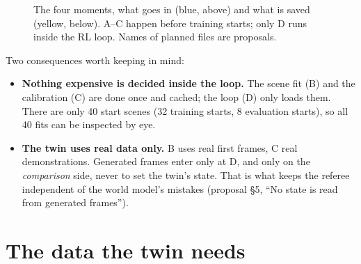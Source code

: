 \documentclass[11pt,a4paper]{article}
\begin{document}
\begin{figure}[h]
\caption{The four moments, what goes in (blue, above) and what is saved (yellow, below). A--C happen before training starts; only D runs inside the RL loop. Names of planned files are proposals.}
\label{fig:lifecycle}
\end{figure}

Two consequences worth keeping in mind:
\begin{itemize}
\item \textbf{Nothing expensive is decided inside the loop.} The scene fit (B) and the calibration (C) are done once and cached; the loop (D) only loads them. There are only 40 start scenes (32 training starts, 8 evaluation starts), so all 40 fits can be inspected by eye.
\item \textbf{The twin uses real data only.} B uses real first frames, C real demonstrations. Generated frames enter only at D, and only on the \emph{comparison} side, never to set the twin's state. That is what keeps the referee independent of the world model's mistakes (proposal \S5, ``No state is read from generated frames'').
\end{itemize}

\section{The data the twin needs}\label{sec:data}
\end{document}
